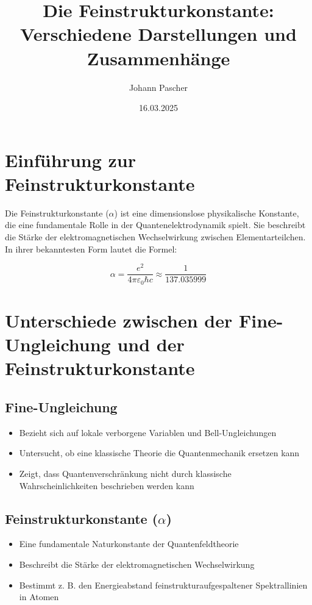 \documentclass{article}
\title{Die Feinstrukturkonstante: Verschiedene Darstellungen und Zusammenhänge}
\author{Johann Pascher}
\date{16.03.2025}
\begin{document}
	
	\maketitle
	\tableofcontents
	\section{Einführung zur Feinstrukturkonstante}
	
	Die Feinstrukturkonstante ($\alpha$) ist eine dimensionslose physikalische Konstante, die eine fundamentale Rolle in der Quantenelektrodynamik spielt. Sie beschreibt die Stärke der elektromagnetischen Wechselwirkung zwischen Elementarteilchen. In ihrer bekanntesten Form lautet die Formel:
	
	\begin{equation}
		\alpha = \frac{e^2}{4\pi\varepsilon_0\hbar c} \approx \frac{1}{137.035999}
	\end{equation}
	
	\section{Unterschiede zwischen der Fine-Ungleichung und der Feinstrukturkonstante}
	
	\subsection{Fine-Ungleichung}
	\begin{itemize}
		\item Bezieht sich auf lokale verborgene Variablen und Bell-Ungleichungen
		\item Untersucht, ob eine klassische Theorie die Quantenmechanik ersetzen kann
		\item Zeigt, dass Quantenverschränkung nicht durch klassische Wahrscheinlichkeiten beschrieben werden kann
	\end{itemize}
	
	\subsection{Feinstrukturkonstante ($\alpha$)}
	\begin{itemize}
		\item Eine fundamentale Naturkonstante der Quantenfeldtheorie
		\item Beschreibt die Stärke der elektromagnetischen Wechselwirkung
		\item Bestimmt z. B. den Energieabstand feinstrukturaufgespaltener Spektrallinien in Atomen
	\end{itemize}
	
\end{document}
